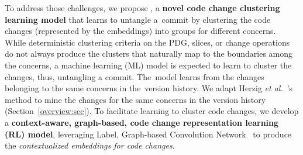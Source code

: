 



To address those challenges, we propose {\bf \tool}, a {\bf novel code
  change clustering learning model} that learns to untangle a~commit
by clustering the code changes (represented by the embeddings) into
groups for different concerns.
%
While deterministic clustering criteria on the PDG, slices, or change
operations do not always produce the clusters that naturally map to
the boundaries among the concerns, a machine learning (ML) model is
expected to learn to cluster the changes, thus, untangling a
commit. The~model learns from the changes belonging to the same
concerns in the~version history. We adapt Herzig {\em et
  al.}~\cite{kim-emse16}'s method to mine the changes for the same
concerns in the version history (Section~\ref{overview:sec}).
%
To facilitate learning to cluster code changes, we develop a {\bf
  context-aware, graph-based, code change representation learning (RL)
  model}, leveraging Label, Graph-based Convolution
Network~\cite{label-gcn} to produce the {\em contextualized embeddings
  for code changes}.

